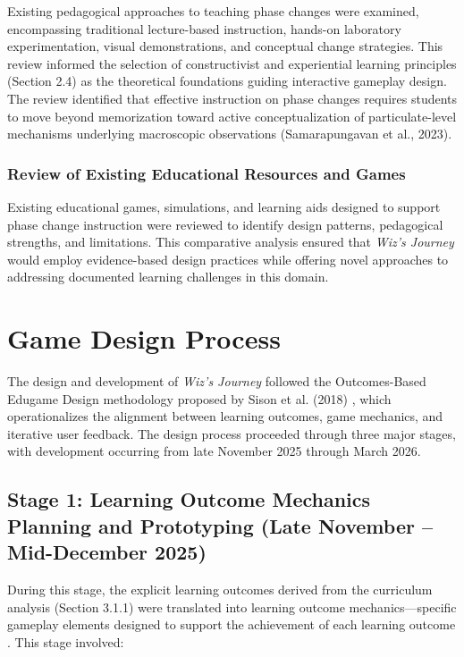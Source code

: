 Existing pedagogical approaches to teaching phase changes were examined, encompassing traditional lecture-based instruction, hands-on laboratory experimentation, visual demonstrations, and conceptual change strategies. This review informed the selection of constructivist and experiential learning principles (Section 2.4) as the theoretical foundations guiding interactive gameplay design. The review identified that effective instruction on phase changes requires students to move beyond memorization toward active conceptualization of particulate-level mechanisms underlying macroscopic observations (Samarapungavan et al., 2023).

\subsubsection{Review of Existing Educational Resources and Games}

Existing educational games, simulations, and learning aids designed to support phase change instruction were reviewed to identify design patterns, pedagogical strengths, and limitations. This comparative analysis ensured that \textit{Wiz's Journey} would employ evidence-based design practices while offering novel approaches to addressing documented learning challenges in this domain.

\section{Game Design Process}

The design and development of \textit{Wiz's Journey} followed the Outcomes-Based Edugame Design methodology proposed by Sison et al. (2018) \cite{Sison2018}, which operationalizes the alignment between learning outcomes, game mechanics, and iterative user feedback. The design process proceeded through three major stages, with development occurring from late November 2025 through March 2026.

\subsection{Stage 1: Learning Outcome Mechanics Planning and Prototyping (Late November -- Mid-December 2025)}

During this stage, the explicit learning outcomes derived from the curriculum analysis (Section 3.1.1) were translated into learning outcome mechanics---specific gameplay elements designed to support the achievement of each learning outcome \cite{Sison2018}. This stage involved:

